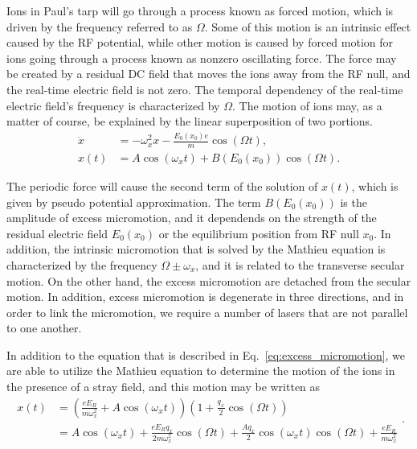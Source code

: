 Ions in Paul's tarp will go through a process known as forced motion, which is driven by the frequency referred to as \(\Omega\). Some of this motion is an intrinsic effect caused by the RF potential, while other motion is caused by forced motion for ions going through a process known as nonzero oscillating force. The force may be created by a residual DC field that moves the ions away from the RF null, and the real-time electric field is not zero. The temporal dependency of the real-time electric field's frequency is characterized by \(\Omega\). The motion of ions may, as a matter of course, be explained by the linear superposition of two portions.
\begin{equation}\label{eq:excess_micromotion}
    \begin{aligned}
        \ddot{x} & =-\omega_x^2 x-\frac{E_0\left(x_0\right) e}{m} \cos (\Omega t),                    \\
        x(t)     & =A \cos \left(\omega_x t\right)+B\left(E_0\left(x_0\right)\right) \cos (\Omega t).
    \end{aligned}
\end{equation}

The periodic force will cause the second term of the solution of \(x(t)\), which is given by pseudo potential approximation. The term \(B(E_0(x_0))\) is the amplitude of excess micromotion, and it dependends on the strength of the residual electric field \(E_0(x_0)\) or the equilibrium position from RF null \(x_0\). In addition, the intrinsic micromotion that is solved by the Mathieu equation is characterized by the frequency \(\Omega\pm \omega_x\), and it is related to the transverse secular motion. On the other hand, the excess micromotion are detached from the secular motion. In addition, excess micromotion is degenerate in three directions, and in order to link the micromotion, we require a number of lasers that are not parallel to one another.

In addition to the equation that is described in Eq.~\eqref{eq:excess_micromotion}, we are able to utilize the Mathieu equation to determine the motion of the ions in the presence of a stray field, and this motion may be written as
\begin{equation}
    \begin{aligned}
        x(t) & =\left(\frac{e E_R}{m \omega_x^2}+A \cos \left(\omega_x t\right)\right)\left(1+\frac{q_x}{2} \cos (\Omega t)\right)                                                      \\
             & =A \cos \left(\omega_x t\right)+\frac{e E_R q_x}{2 m \omega_x^2} \cos (\Omega t)+\frac{A q_x}{2} \cos \left(\omega_x t\right) \cos (\Omega t)+\frac{e E_R}{m \omega_x^2}
    \end{aligned}
    .
\end{equation}


